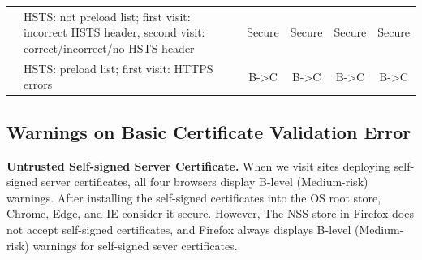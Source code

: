 \begin{table}[htbp]
\begin{tabular}{p{2.5cm}|p{8cm}|cccc}
                                                                                                    & HSTS: not preload list; first visit: incorrect HSTS header, second visit: correct/incorrect/no HSTS header    & Secure               & Secure               & Secure               & Secure               \\
                                                                                                    & HSTS: preload list; first visit: HTTPS errors                                                       & B-\textgreater{}C    & B-\textgreater{}C    & B-\textgreater{}C    & B-\textgreater{}C    \\ \hline
\end{tabular}
  \vspace{6pt}



\end{table}%



\subsection{Warnings on Basic Certificate Validation Error}

\textbf{Untrusted Self-signed Server Certificate.}
    When we visit sites deploying self-signed server certificates, all four browsers display B-level (Medium-risk) warnings.
    After installing the self-signed certificates into the OS root store, Chrome, Edge, and IE consider it secure.
    However, The NSS store in Firefox does not accept self-signed certificates, and Firefox always displays B-level (Medium-risk) warnings for self-signed sever certificates.

